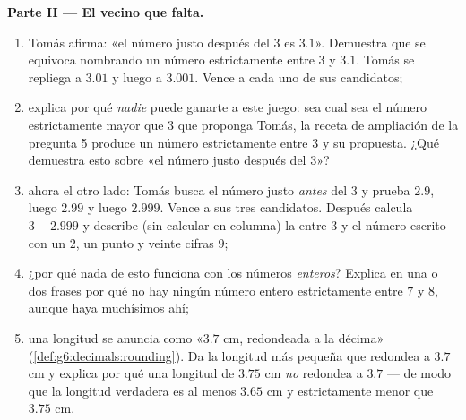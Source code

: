 \begin{problem}
\medskip
\noindent\textbf{Parte II --- El vecino que falta.}
\begin{enumerate}[resume]
  \item Tomás afirma: «el número justo después del $3$ es $3.1$». Demuestra
        que se equivoca nombrando un número estrictamente entre $3$ y
        $3.1$. Tomás se repliega a $3.01$ y luego a $3.001$. Vence a cada
        uno de sus candidatos;
  \item explica por qué \emph{nadie} puede ganarte a este juego:
        sea cual sea el número estrictamente mayor que $3$ que proponga Tomás,
        la receta de ampliación de la pregunta 5 produce un número estrictamente
        entre $3$ y su propuesta. ¿Qué demuestra esto sobre
        «el número justo después del $3$»?
  \item ahora el otro lado: Tomás busca el número justo
        \emph{antes} del $3$ y prueba $2.9$, luego $2.99$ y luego
        $2.999$. Vence a sus tres candidatos. Después calcula
        $3 - 2.999$ y describe (sin calcular en columna)
        la  entre $3$ y el número escrito con un
        $2$, un punto y veinte cifras $9$;
  \item ¿por qué nada de esto funciona con los números \emph{enteros}?
        Explica en una o dos frases por qué no hay ningún número
        entero estrictamente entre $7$ y $8$, aunque
        haya muchísimos  ahí;
  \item una longitud se anuncia como «$3.7$ cm, redondeada a la
        décima» (\cref{def:g6:decimals:rounding}). Da la
        longitud más pequeña que redondea a $3.7$ cm y explica por qué
        una longitud de $3.75$ cm \emph{no} redondea a $3.7$ ---
        de modo que la longitud verdadera es al menos $3.65$ cm y estrictamente
        menor que $3.75$ cm.
\end{enumerate}


\end{problem}
